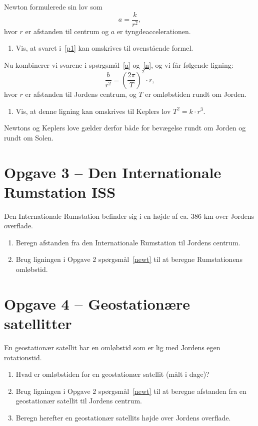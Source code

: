 \documentclass[12pt,oneside,a4paper]{article}
\theoremstyle{plain}
\begin{document}
Newton formulerede sin lov som
$$
a = \frac{k}{r^2},
$$
hvor $r$ er afstanden til centrum og $a$ er tyngdeaccelerationen.

\begin{enumerate}[label=(\alph*) ,resume]
    \item Vis, at svaret i~\ref{p1} kan omskrives til ovenstående formel.
\end{enumerate}

Nu kombinerer vi svarene i spørgsmål~\ref{a} og~\ref{n}, og vi får følgende ligning:
$$
\frac{b}{r^2} = \left(\frac{2\pi}{T}\right)^2 \cdot r,
$$
hvor $r$ er afstanden til Jordens centrum, og $T$ er omløbstiden
rundt om Jorden.
\begin{enumerate}[label=(\alph*) ,resume]
    \item Vis, at denne ligning kan omskrives til Keplers lov $T^2 = k\cdot r^3$. \label{newt}
\end{enumerate}

Newtons og Keplers love gælder derfor både for bevægelse rundt om Jorden og rundt om Solen.


\section*{Opgave 3 -- Den Internationale Rumstation ISS}
Den Internationale Rumstation befinder sig i en højde af ca. 386 km over Jordens overflade.
\begin{enumerate}[label=(\alph*)]
    \item Beregn afstanden fra den Internationale Rumstation til Jordens centrum.
    \item Brug ligningen i Opgave 2 spørgsmål~\ref{newt} til at beregne Rumstationens omløbstid.
\end{enumerate}


\section*{Opgave 4 -- Geostationære satellitter}
En geostationær satellit har en omløbstid som er lig med Jordens egen rotationstid.
\begin{enumerate}[label=(\alph*)]
    \item Hvad er omløbstiden for en geostationær satellit (målt i dage)?
    \item Brug ligningen i Opgave 2 spørgsmål~\ref{newt} til at beregne afstanden fra en geostationær
        satellit til Jordens centrum.
    \item Beregn herefter en geostationær satellits højde over Jordens overflade.
\end{enumerate}
\end{document}
